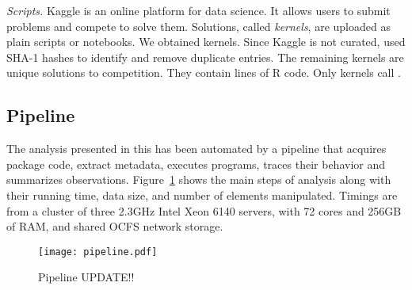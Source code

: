 \documentclass[screen,acmsmall]{acmart}
\newcommand{\mypara}[1]{\medskip\noindent\emph{#1}\xspace}
\begin{document}
\mypara{Scripts.} Kaggle is an online platform for data science. It allows users
to submit problems and compete to solve them. Solutions, called \emph{kernels},
are uploaded as plain scripts or notebooks. We obtained \KaggleKernels kernels.
Since Kaggle is not curated, used SHA-1 hashes to identify and remove
\KaggleDuplicates duplicate entries. The remaining \KaggleUnique kernels are
unique solutions to \KaggleCompetitions competition. They contain \KaggleCode
lines of R code. Only \KaggleWithEvals kernels  call \eval.

\subsection{Pipeline}

The analysis presented in this has been automated by a pipeline that acquires
package code, extract metadata, executes programs, traces their behavior and
summarizes observations. Figure~\ref{fig:pipeline} shows the main steps of
analysis along with their running time, data size, and number of elements
manipulated. Timings are from a cluster of three 2.3GHz Intel Xeon 6140 servers,
with 72 cores and 256GB of RAM, and shared OCFS network storage.

\begin{figure}[!h]\hspace{-5mm}
  \texttt{[image: pipeline.pdf]}
  \caption{Pipeline UPDATE!!}\label{fig:pipeline}
\end{figure}
\end{document}
